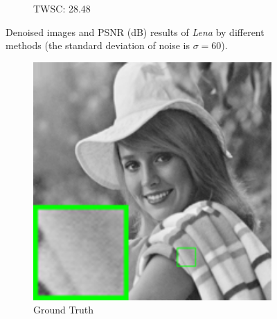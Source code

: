 \begin{figure}
\begin{adjustwidth}{-2cm}{}
\begin{subfigure}[t]{0.19\textwidth}
		\caption{TWSC: 28.48}
    \end{subfigure}
    \caption{Denoised images and PSNR (dB) results of \textsl{Lena} by different methods (the standard deviation of noise is $\sigma=60$).}
    \label{fig5-4}
\end{adjustwidth}
\end{figure}

\begin{figure}
\begin{adjustwidth}{-2cm}{}
    \centering
    \begin{subfigure}[t]{0.19\textwidth}
        \centering
        \includegraphics[width=1\textwidth]{images/twsc/awgn/resize_br_elaine.png}
	   \caption{Ground Truth}
    \end{subfigure}
    \hfill
    \begin{subfigure}[t]{0.19\textwidth}
        \centering

\end{subfigure}
\end{adjustwidth}
\end{figure}
